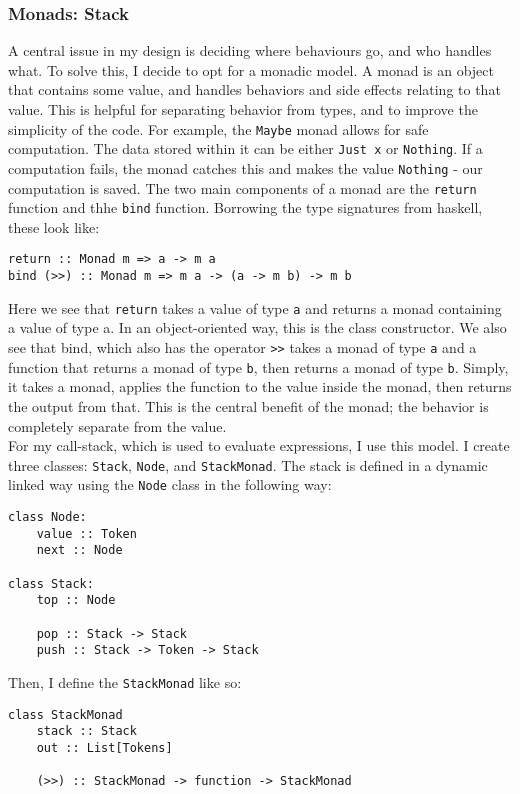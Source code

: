 \documentclass[a4paper, 12pt]{article}
\begin{document}
\subsubsection{Monads: Stack}\label{sec:monads-stack}
A central issue in my design is deciding where behaviours go, and who handles what. To solve this, I decide to opt for a monadic model. A monad is an object that contains some value, and handles behaviors and side effects relating to that value. This is helpful for separating behavior from types, and to improve the simplicity of the code. For example, the \verb|Maybe| monad allows for safe computation. The data stored within it can be either \verb|Just x| or \verb|Nothing|. If a computation fails, the monad catches this and makes the value \verb|Nothing| - our computation is saved. The two main components of a monad are the \verb|return| function and thhe \verb|bind| function. Borrowing the type signatures from haskell, these look like:
\begin{verbatim}
return :: Monad m => a -> m a
bind (>>) :: Monad m => m a -> (a -> m b) -> m b
\end{verbatim}

Here we see that \verb|return| takes a value of type \verb|a| and returns a monad containing a value of type a. In an object-oriented way, this is the class constructor. We also see that bind, which also has the operator \verb|>>| takes a monad of type \verb|a| and a function that returns a monad of type \verb|b|, then returns a monad of type \verb|b|. Simply, it takes a monad, applies the function to the value inside the monad, then returns the output from that. This is the central benefit of the monad; the behavior is completely separate from the value.\\

For my call-stack, which is used to evaluate expressions, I use this model. I create three classes: \verb|Stack|, \verb|Node|, and \verb|StackMonad|. The stack is defined in a dynamic linked way using the \verb|Node| class in the following way:
\begin{verbatim}
class Node:
    value :: Token
    next :: Node

class Stack:
    top :: Node
    
    pop :: Stack -> Stack
    push :: Stack -> Token -> Stack
\end{verbatim}

Then, I define the \verb|StackMonad| like so:
\begin{verbatim}
class StackMonad
    stack :: Stack
    out :: List[Tokens]
    
    (>>) :: StackMonad -> function -> StackMonad
\end{verbatim}
\end{document}
